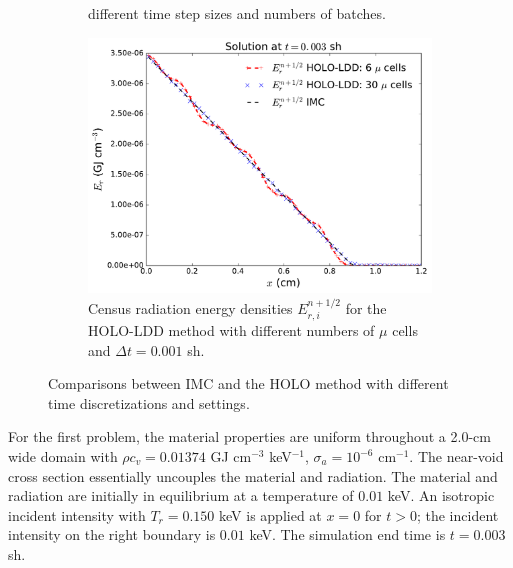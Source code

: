 \documentclass{anstrans}
\begin{document}
\begin{figure}[bth!]
\begin{subfigure}{0.48\textwidth}
{    different time step sizes and numbers of batches.}
\end{subfigure}
\begin{subfigure}{0.52\textwidth}
  \centering
    \includegraphics[width=\textwidth]{void_ang_compare.pdf}
    \caption{\label{fig:bumps} Census radiation energy densities $E_{r,i}^{n+1/2}$ for
    the HOLO-LDD method with different numbers of $\mu$ cells and $\Delta t=0.001$ sh.
}
\end{subfigure}
\caption{Comparisons between IMC and the HOLO method with different time discretizations and
settings.}
\end{figure}  

For the first problem, the material properties
are uniform throughout a 2.0-cm wide domain with $\rho c_v = 0.01374$ GJ cm$^{-3}$ keV$^{-1}$, $\sigma_a=10^{-6}$ cm$^{-1}$.
The near-void cross section essentially uncouples the material and radiation.  
The material and radiation are initially in equilibrium at a temperature of $0.01$ keV.
An isotropic incident intensity with $T_r = 0.150$ keV is applied
at $x=0$ for $t>0$; the incident intensity on the right boundary is $0.01$ keV.  The simulation end
time is $t=0.003$ sh.  
\end{document}
